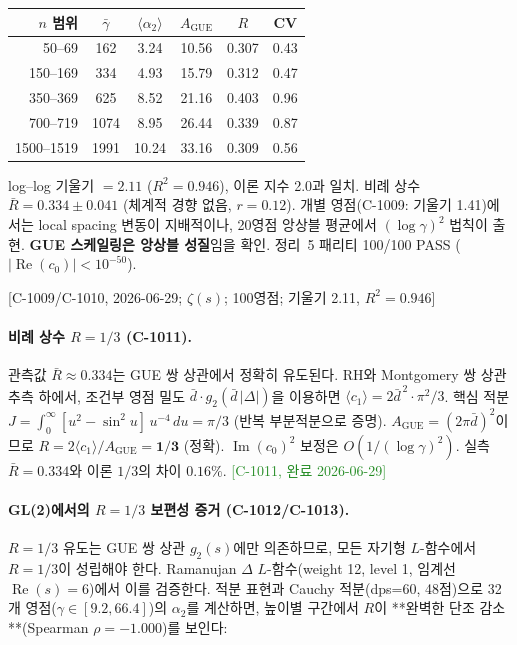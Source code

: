 \documentclass[11pt, a4paper]{article}
\theoremstyle{definition}
\theoremstyle{plain}
\begin{document}
\smallskip
\begin{center}
\renewcommand{\arraystretch}{1.15}
\begin{tabular}{rccccc}
\toprule
$n$ 범위 & $\bar\gamma$ & $\langle\alpha_2\rangle$
  & $A_{\mathrm{GUE}}$ & $R$ & CV \\
\midrule
50--69    &   162 &  3.24 & 10.56 & 0.307 & 0.43 \\
150--169  &   334 &  4.93 & 15.79 & 0.312 & 0.47 \\
350--369  &   625 &  8.52 & 21.16 & 0.403 & 0.96 \\
700--719  &  1074 &  8.95 & 26.44 & 0.339 & 0.87 \\
1500--1519& 1991 & 10.24 & 33.16 & 0.309 & 0.56 \\
\bottomrule
\end{tabular}
\end{center}

\smallskip\noindent
log--log 기울기 $= 2.11$ ($R^2 = 0.946$), 이론 지수 2.0과 일치.
비례 상수 $\bar R = 0.334 \pm 0.041$ (체계적 경향 없음, $r = 0.12$).
개별 영점(C-1009: 기울기 1.41)에서는 local spacing 변동이 지배적이나,
20영점 앙상블 평균에서 $(\log\gamma)^2$ 법칙이 출현.
\textbf{GUE 스케일링은 앙상블 성질}임을 확인.
정리~5 패리티 100/100 PASS ($|\operatorname{Re}(c_0)| < 10^{-50}$).

[C-1009/C-1010, 2026-06-29; $\zeta(s)$; 100영점; 기울기 2.11, $R^2{=}0.946$]

\paragraph{비례 상수 $R = 1/3$ (C-1011).}
관측값 $\bar R \approx 0.334$는 GUE 쌍 상관에서 정확히 유도된다.
RH와 Montgomery 쌍 상관 추측 하에서,
조건부 영점 밀도 $\bar d \cdot g_2(\bar d\,|\Delta|)$을 이용하면
$\langle c_1 \rangle = 2\bar d^{\,2} \cdot \pi^2/3$.
핵심 적분 $J = \int_0^\infty [u^2 - \sin^2 u]\,u^{-4}\,du = \pi/3$
(반복 부분적분으로 증명).
$A_{\mathrm{GUE}} = (2\pi\bar d)^2$이므로
$R = 2\langle c_1\rangle/A_{\mathrm{GUE}} = \mathbf{1/3}$ (정확).
$\operatorname{Im}(c_0)^2$ 보정은 $O(1/(\log\gamma)^2)$.
실측 $\bar R = 0.334$와 이론 $1/3$의 차이 $0.16\%$.
\textcolor{ForestGreen}{[C-1011, 완료 2026-06-29]}

\paragraph{GL(2)에서의 $R = 1/3$ 보편성 증거 (C-1012/C-1013).}
$R = 1/3$ 유도는 GUE 쌍 상관 $g_2(s)$에만 의존하므로, 모든 자기형 $L$-함수에서 $R = 1/3$이 성립해야 한다.
Ramanujan $\Delta$ $L$-함수(weight 12, level 1, 임계선 $\operatorname{Re}(s) = 6$)에서 이를 검증한다.
적분 표현과 Cauchy 적분(dps=60, 48점)으로 32개 영점($\gamma \in [9.2, 66.4]$)의 $\alpha_2$를 계산하면,
높이별 구간에서 $R$이 **완벽한 단조 감소**(Spearman $\rho = -1.000$)를 보인다:
\end{document}

